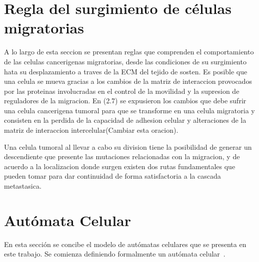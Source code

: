 \section{Regla del surgimiento de c\'elulas migratorias}
 A lo largo de esta seccion se presentan reglas que comprenden el comportamiento de las celulas cancerigenas migratorias, desde las condiciones de su surgimiento hata su desplazamiento a traves de la ECM del tejido de sosten. Es posible que una celula se mueva gracias a los cambios de la matriz de interaccion provocados por las proteinas involucradas en el control de la movilidad y la supresion de reguladores de la migracion. En (2.7) se expusieron los cambios que debe sufrir una celula cancerigena tumoral para que se transforme en una celula migratoria y consisten en la perdida de la capacidad de adhesion celular y alteraciones de la matriz de interaccion intercelular(Cambiar esta oracion).

Una celula tumoral al llevar a cabo su division tiene la posibilidad de generar un descendiente que presente las mutaciones relacionadas con la migracion, y de acuerdo a la localizacion donde surgen existen dos rutas fundamentales que pueden tomar para dar continuidad de forma satisfactoria a la cascada metastasica.

\section{Aut\'omata Celular}

En esta secci\'on se concibe el modelo de aut\'omatas celulares que se presenta en este trabajo. Se comienza definiendo formalmente un aut\'omata celular~\cite{7}.

